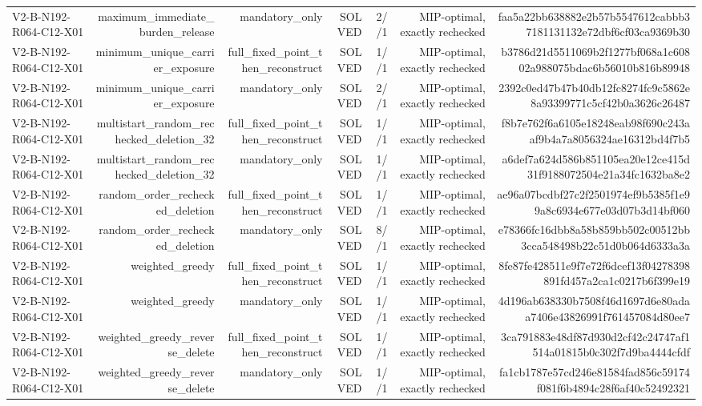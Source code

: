 {\begin{longtable}{lrrrrrr}
V2-B-N192-R064-C12-X01 & maximum\_immediate\_burden\_release & mandatory\_only & SOLVED & 2//1 & MIP-optimal, exactly rechecked & faa5a22bb638882e2b57b5547612cabbb37181131132e72dbf6cf03ca9369b30 \\
V2-B-N192-R064-C12-X01 & minimum\_unique\_carrier\_exposure & full\_fixed\_point\_then\_reconstruct & SOLVED & 1//1 & MIP-optimal, exactly rechecked & b3786d21d5511069b2f1277bf068a1c60802a988075bdac6b56010b816b89948 \\
V2-B-N192-R064-C12-X01 & minimum\_unique\_carrier\_exposure & mandatory\_only & SOLVED & 2//1 & MIP-optimal, exactly rechecked & 2392c0ed47b47b40db12fc8274fc9c5862e8a93399771c5cf42b0a3626c26487 \\
V2-B-N192-R064-C12-X01 & multistart\_random\_rechecked\_deletion\_32 & full\_fixed\_point\_then\_reconstruct & SOLVED & 1//1 & MIP-optimal, exactly rechecked & f8b7e762f6a6105e18248eab98f690c243aaf9b4a7a8056324ae16312bd4f7b5 \\
V2-B-N192-R064-C12-X01 & multistart\_random\_rechecked\_deletion\_32 & mandatory\_only & SOLVED & 1//1 & MIP-optimal, exactly rechecked & a6def7a624d586b851105ea20e12ce415d31f9188072504e21a34fc1632ba8e2 \\
V2-B-N192-R064-C12-X01 & random\_order\_rechecked\_deletion & full\_fixed\_point\_then\_reconstruct & SOLVED & 1//1 & MIP-optimal, exactly rechecked & ae96a07bcdbf27c2f2501974ef9b5385f1e99a8c6934e677e03d07b3d14bf060 \\
V2-B-N192-R064-C12-X01 & random\_order\_rechecked\_deletion & mandatory\_only & SOLVED & 8//1 & MIP-optimal, exactly rechecked & e78366fc16dbb8a58b859bb502c00512bb3cca548498b22c51d0b064d6333a3a \\
V2-B-N192-R064-C12-X01 & weighted\_greedy & full\_fixed\_point\_then\_reconstruct & SOLVED & 1//1 & MIP-optimal, exactly rechecked & 8fe87fe428511e9f7e72f6dcef13f04278398891fd457a2ca1c0217b6f399e19 \\
V2-B-N192-R064-C12-X01 & weighted\_greedy & mandatory\_only & SOLVED & 1//1 & MIP-optimal, exactly rechecked & 4d196ab638330b7508f46d1697d6e80adaa7406e43826991f761457084d80ee7 \\
V2-B-N192-R064-C12-X01 & weighted\_greedy\_reverse\_delete & full\_fixed\_point\_then\_reconstruct & SOLVED & 1//1 & MIP-optimal, exactly rechecked & 3ca791883e48df87d930d2cf42c24747af1514a01815b0c302f7d9ba4444cfdf \\
V2-B-N192-R064-C12-X01 & weighted\_greedy\_reverse\_delete & mandatory\_only & SOLVED & 1//1 & MIP-optimal, exactly rechecked & fa1cb1787e57cd246e81584fad856c59174f081f6b4894c28f6af40c52492321 \\

\end{longtable}}
